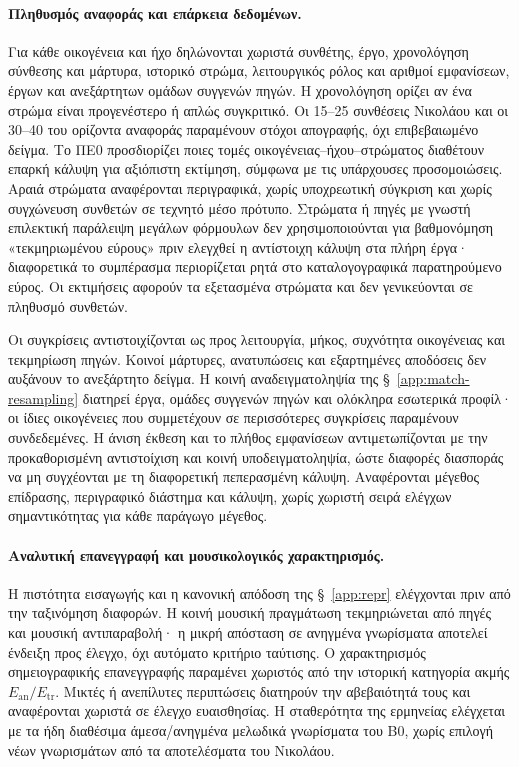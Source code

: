 \documentclass[11pt,a4paper]{article}
\begin{document}
\paragraph{Πληθυσμός αναφοράς και επάρκεια δεδομένων.}
Για κάθε οικογένεια και ήχο δηλώνονται χωριστά συνθέτης, έργο, χρονολόγηση σύνθεσης και μάρτυρα, ιστορικό στρώμα, λειτουργικός ρόλος και αριθμοί εμφανίσεων, έργων και ανεξάρτητων ομάδων συγγενών πηγών. Η χρονολόγηση ορίζει αν ένα στρώμα είναι προγενέστερο ή απλώς συγκριτικό. Οι 15--25 συνθέσεις Νικολάου και οι 30--40 του ορίζοντα αναφοράς παραμένουν στόχοι απογραφής, όχι επιβεβαιωμένο δείγμα. Το ΠΕ0 προσδιορίζει ποιες τομές οικογένειας--ήχου--στρώματος διαθέτουν επαρκή κάλυψη για αξιόπιστη εκτίμηση, σύμφωνα με τις υπάρχουσες προσομοιώσεις. Αραιά στρώματα αναφέρονται περιγραφικά, χωρίς υποχρεωτική σύγκριση και χωρίς συγχώνευση συνθετών σε τεχνητό μέσο πρότυπο. Στρώματα ή πηγές με γνωστή επιλεκτική παράλειψη μεγάλων φόρμουλων δεν χρησιμοποιούνται για βαθμονόμηση «τεκμηριωμένου εύρους» πριν ελεγχθεί η αντίστοιχη κάλυψη στα πλήρη έργα· διαφορετικά το συμπέρασμα περιορίζεται ρητά στο καταλογογραφικά παρατηρούμενο εύρος. Οι εκτιμήσεις αφορούν τα εξετασμένα στρώματα και δεν γενικεύονται σε πληθυσμό συνθετών.

Οι συγκρίσεις αντιστοιχίζονται ως προς λειτουργία, μήκος, συχνότητα οικογένειας και τεκμηρίωση πηγών. Κοινοί μάρτυρες, ανατυπώσεις και εξαρτημένες αποδόσεις δεν αυξάνουν το ανεξάρτητο δείγμα. Η κοινή αναδειγματοληψία της §~\ref{app:match-resampling} διατηρεί έργα, ομάδες συγγενών πηγών και ολόκληρα εσωτερικά προφίλ· οι ίδιες οικογένειες που συμμετέχουν σε περισσότερες συγκρίσεις παραμένουν συνδεδεμένες. Η άνιση έκθεση και το πλήθος εμφανίσεων αντιμετωπίζονται με την προκαθορισμένη αντιστοίχιση και κοινή υποδειγματοληψία, ώστε διαφορές διασποράς να μη συγχέονται με τη διαφορετική πεπερασμένη κάλυψη. Αναφέρονται μέγεθος επίδρασης, περιγραφικό διάστημα και κάλυψη, χωρίς χωριστή σειρά ελέγχων σημαντικότητας για κάθε παράγωγο μέγεθος.

\paragraph{Αναλυτική επανεγγραφή και μουσικολογικός χαρακτηρισμός.}
Η πιστότητα εισαγωγής και η κανονική απόδοση της §~\ref{app:repr} ελέγχονται πριν από την ταξινόμηση διαφορών. Η κοινή μουσική πραγμάτωση τεκμηριώνεται από πηγές και μουσική αντιπαραβολή· η μικρή απόσταση σε ανηγμένα γνωρίσματα αποτελεί ένδειξη προς έλεγχο, όχι αυτόματο κριτήριο ταύτισης. Ο χαρακτηρισμός σημειογραφικής επανεγγραφής παραμένει χωριστός από την ιστορική κατηγορία ακμής $E_{\mathrm{an}}/E_{\mathrm{tr}}$. Μικτές ή ανεπίλυτες περιπτώσεις διατηρούν την αβεβαιότητά τους και αναφέρονται χωριστά σε έλεγχο ευαισθησίας. Η σταθερότητα της ερμηνείας ελέγχεται με τα ήδη διαθέσιμα άμεσα/ανηγμένα μελωδικά γνωρίσματα του B0, χωρίς επιλογή νέων γνωρισμάτων από τα αποτελέσματα του Νικολάου.
\end{document}
